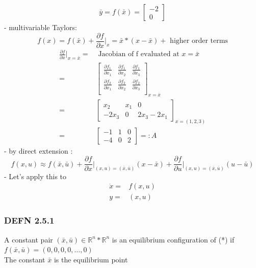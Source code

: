 \documentclass[letterpaper]{article}
\begin{document}
\begin{align*}
  \bar y=f(\bar x)=\begin{bmatrix}-2 \\0\end{bmatrix}
\end{align*}
- multivariable Taylors: $$f(x)=f(\bar x)+\frac{\partial f}{\partial x}\vert_x=\bar x*(x-\bar x)+\text{ higher order terms}$$
\begin{align*}
  \frac{\partial f}{\partial x}\vert_{x=\bar x}=&\text{ Jacobian of f evaluated at }x=\bar x\\
  =&\begin{bmatrix}
  \frac{\partial f_1}{\partial x_1} & \frac{\partial f_1}{\partial x_2} & \frac{\partial f_1}{\partial x_3} \\
  \frac{\partial f_2}{\partial x_1} & \frac{\partial f_2}{\partial x_2} & \frac{\partial f_2}{\partial x_3} \\
  \end{bmatrix}_{x=\bar x}\\
  =&\begin{bmatrix}
  x_2                               & x_1                               & 0                                 \\
  -2x_3                             & 0                                 & 2x_3-2x_1                         
  \end{bmatrix}_{x=(1,2,3)}\\
  =&\begin{bmatrix}
  -1                                & 1                                 & 0                                 \\
  -4                                & 0                                 & 2                                 
  \end{bmatrix}=: A
\end{align*}
- by direct extension : $$f(x,u)\approx f(\bar x, \bar u)+\frac{\partial f}{\partial x}\vert_{(x,u)=(\bar x,\bar u)}(x-\bar x)+\frac{\partial f}{\partial u}\vert_{(x,u)=(\bar x,\bar u)}(u-\bar u)$$
- Let's apply this to 
\begin{align*}
  \dot x= & f(x,u) \\
  y=      & (x,u)  
\end{align*}
\subsubsection*{DEFN 2.5.1} A constant pair $(\bar x, \bar u)\in \mathbb{R}^n*\mathbb{R}^n$ is an equilibrium configuration of (*) if $f(\bar x, \bar u)=(0,0,0,0,\hdots,0)$\\
The constant $\bar x$ is the equilibrium point
\end{document}
